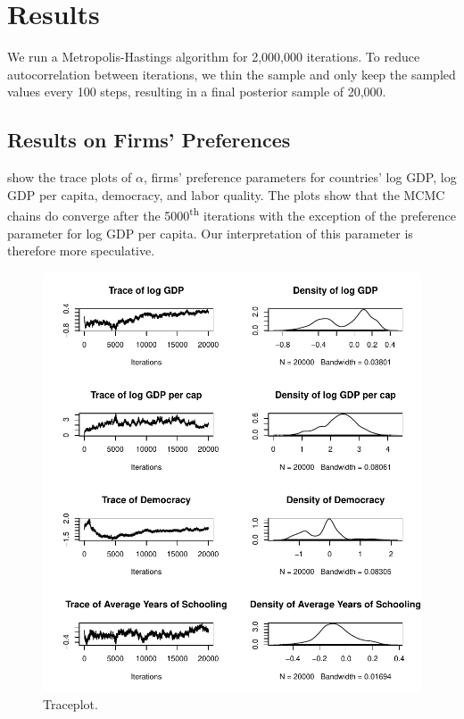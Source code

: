 \section{Results}
\label{sec:result}

We run a Metropolis-Hastings algorithm for 2,000,000 iterations. To reduce autocorrelation between iterations, we thin the sample and only keep the sampled values every 100 steps, resulting in a final posterior sample of 20,000.

\subsection{Results on Firms' Preferences}

 show the trace plots of $\alpha$, firms' preference parameters for countries' log GDP, log GDP per capita, democracy, and labor quality. The plots show that the MCMC chains do converge after the 5000\textsuperscript{th} iterations with the exception of the preference parameter for log GDP per capita. Our interpretation of this parameter is therefore more speculative.

\begin{figure}[!ht]
\centering
\includegraphics[width=\textwidth,keepaspectratio]{../figure/traceplot_alpha}
\caption{Traceplot.}
\label{fig:traceplot_alpha}
\end{figure}

